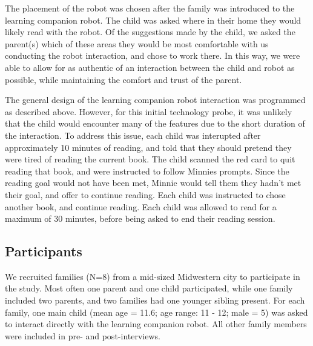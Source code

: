 \documentclass{sigchi}
\begin{document}
The placement of the robot was chosen after the family was introduced to the learning companion robot. The child was asked where in their home they would likely read with the robot. Of the suggestions made by the child, we asked the parent(s) which of these areas they would be most comfortable with us conducting the robot interaction, and chose to work there. In this way, we were able to allow for as authentic of an interaction between the child and robot as possible, while maintaining the comfort and trust of the parent. 

The general design of the learning companion robot interaction was programmed as described above. However, for this initial technology probe, it was unlikely that the child would encounter many of the features due to the short duration of the interaction. To address this issue, each child was interupted after approximately 10 minutes of reading, and told that they should pretend they were tired of reading the current book. The child scanned the red card to quit reading that book, and were instructed to follow Minnies prompts. Since the reading goal would not have been met, Minnie would tell them they hadn't met their goal, and offer to continue reading. Each child was instructed to chose another book, and continue reading. Each child was allowed to read for a maximum of 30 minutes, before being asked to end their reading session.


\subsection{Participants}
 We recruited families (N=8) from a mid-sized Midwestern city to participate in the study. Most often one parent and one child participated, while one family included two parents, and two families had one younger sibling present. For each family, one main child (mean age = 11.6; age range: 11 - 12; male = 5) was asked to interact directly with the learning companion robot. All other family members were included in pre- and post-interviews.
 
\end{document}
